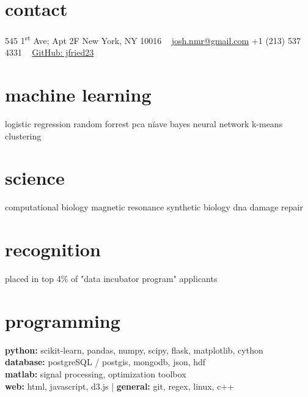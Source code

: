 \documentclass[]{friggeri-cv} %
\begin{document}


\begin{aside} %
\section{contact}
545 1\textsuperscript{st} Ave; Apt 2F
New York, NY 10016
~
\href{mailto:josh.nmr@gmail.com}{josh.nmr@gmail.com}{\color{brown} } 
+1 (213) 537 4331{\color{brown} }
~
\href{https://github.com/jfried23}{GitHub: jfried23}
\section{machine learning}
logistic regression
random forrest
pca
n{\"i}ave bayes
neural network
k-means clustering
\section{science}
computational biology
magnetic resonance
synthetic biology
dna damage repair
\section{recognition}
placed in top 4\% of "data incubator program" applicants 
~
\end{aside}


\section{programming}

\textbf{python:} scikit-learn, pandas, numpy, scipy, flask, matplotlib, cython  \\ \textbf{database:} postgreSQL / postgis, mongodb, json, hdf \\ \textbf{matlab:} signal processing, optimization toolbox \\ \textbf{web:} html, javascript, d3.js  |  \textbf{general:} git, regex, linux, c++
\end{document}
